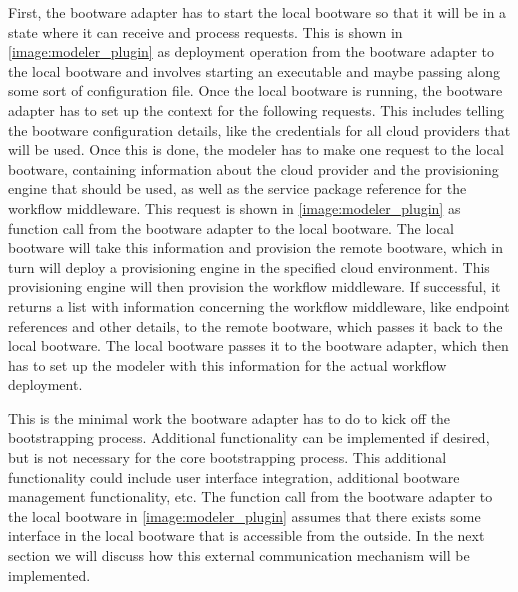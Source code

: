 First, the bootware adapter has to start the local bootware so that it will be in a state where it can receive and process requests.
This is shown in \autoref{image:modeler_plugin} as deployment operation from the bootware adapter to the local bootware and involves starting an executable and maybe passing along some sort of configuration file.
Once the local bootware is running, the bootware adapter has to set up the context for the following requests.
This includes telling the bootware configuration details, like the credentials for all cloud providers that will be used.
Once this is done, the modeler has to make one request to the local bootware, containing information about the cloud provider and the provisioning engine that should be used, as well as the service package reference for the workflow middleware.
This request is shown in \autoref{image:modeler_plugin} as function call from the bootware adapter to the local bootware.
The local bootware will take this information and provision the remote bootware, which in turn will deploy a provisioning engine in the specified cloud environment.
This provisioning engine will then provision the workflow middleware.
If successful, it returns a list with information concerning the workflow middleware, like endpoint references and other details, to the remote bootware, which passes it back to the local bootware.
The local bootware passes it to the bootware adapter, which then has to set up the modeler with this information for the actual workflow deployment.

This is the minimal work the bootware adapter has to do to kick off the bootstrapping process.
Additional functionality can be implemented if desired, but is not necessary for the core bootstrapping process.
This additional functionality could include user interface integration, additional bootware management functionality, etc.
The function call from the bootware adapter to the local bootware in \autoref{image:modeler_plugin} assumes that there exists some interface in the local bootware that is accessible from the outside.
In the next section we will discuss how this external communication mechanism will be implemented.
